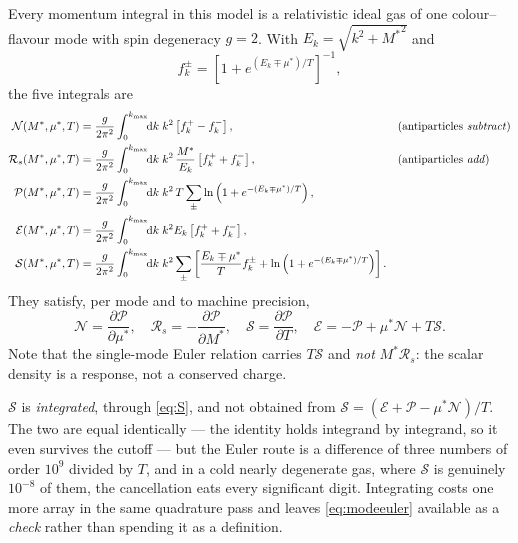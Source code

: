 \documentclass[11pt,a4paper]{article}
\newcommand{\Mstar}{M^{*}}
\newcommand{\mustar}{\mu^{*}}
\begin{document}
Every momentum integral in this model is a relativistic ideal gas of one
colour--flavour mode with spin degeneracy $g=2$. With
$E_k=\sqrt{k^2+{\Mstar}^2}$ and
\begin{equation}
f^{\pm}_k = \left[1+e^{(E_k\mp\mustar)/T}\right]^{-1},
\end{equation}
the five integrals are
\begin{align}
\mathcal N(\Mstar,\mustar,T) &= \frac{g}{2\pi^2}\int_0^{k_{\max}}\!\!\mathrm dk\;k^2
 \left[f^+_k-f^-_k\right],
&&\text{(antiparticles \emph{subtract})}
\label{eq:N}\\
\mathcal R_s(\Mstar,\mustar,T) &= \frac{g}{2\pi^2}\int_0^{k_{\max}}\!\!\mathrm dk\;k^2\,
 \frac{\Mstar}{E_k}\left[f^+_k+f^-_k\right],
&&\text{(antiparticles \emph{add})}
\label{eq:Rs}\\
\mathcal P(\Mstar,\mustar,T) &= \frac{g}{2\pi^2}\int_0^{k_{\max}}\!\!\mathrm dk\;k^2\,T
 \sum_{\pm}\ln\left(1+e^{-(E_k\mp\mustar)/T}\right),
\label{eq:P}\\
\mathcal E(\Mstar,\mustar,T) &= \frac{g}{2\pi^2}\int_0^{k_{\max}}\!\!\mathrm dk\;k^2 E_k
 \left[f^+_k+f^-_k\right],
\label{eq:E}\\
\mathcal S(\Mstar,\mustar,T) &= \frac{g}{2\pi^2}\int_0^{k_{\max}}\!\!\mathrm dk\;k^2
 \sum_{\pm}\left[\frac{E_k\mp\mustar}{T}f^\pm_k
 + \ln\left(1+e^{-(E_k\mp\mustar)/T}\right)\right].
\label{eq:S}
\end{align}
They satisfy, per mode and to machine precision,
\begin{equation}
\mathcal N = \frac{\partial\mathcal P}{\partial\mustar},\quad
\mathcal R_s = -\frac{\partial\mathcal P}{\partial\Mstar},\quad
\mathcal S = \frac{\partial\mathcal P}{\partial T},\quad
\mathcal E = -\mathcal P + \mustar\mathcal N + T\mathcal S .
\label{eq:modeeuler}
\end{equation}
Note that the single-mode Euler relation carries $T\mathcal S$ and \emph{not}
$\Mstar\mathcal R_s$: the scalar density is a response, not a conserved charge.

$\mathcal S$ is \emph{integrated}, through \eqref{eq:S}, and not obtained from
$\mathcal S=(\mathcal E+\mathcal P-\mustar\mathcal N)/T$. The two are equal
identically --- the identity holds integrand by integrand, so it even survives
the cutoff --- but the Euler route is a difference of three numbers of order
$10^{9}$ divided by $T$, and in a cold nearly degenerate gas, where
$\mathcal S$ is genuinely $10^{-8}$ of them, the cancellation eats every
significant digit. Integrating costs one more array in the same quadrature
pass and leaves \eqref{eq:modeeuler} available as a \emph{check} rather than
spending it as a definition.
\end{document}
